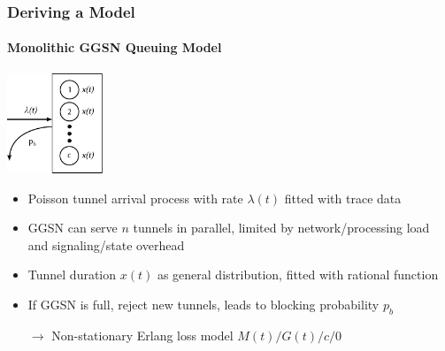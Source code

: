 \documentclass{beamer}
\begin{document}


\begin{frame}
	\frametitle{Deriving a Model}
	\framesubtitle{Monolithic GGSN Queuing Model}
		\begin{center}
			\includegraphics[height=3cm]{../../chapters/041-mobilenetsmeasuring/images/ggsn-monolithic.pdf}
		\end{center}

		\begin{itemize}
			\item Poisson tunnel arrival process with rate $\lambda(t)$ fitted with trace data
			\item GGSN can serve $n$ tunnels in parallel, limited by network/processing load and signaling/state overhead
			\item Tunnel duration $x(t)$ as general distribution, fitted with rational function
			\item If GGSN is full, reject new tunnels, leads to blocking probability $p_b$
			\item[$\rightarrow$] Non-stationary Erlang loss model $M(t)/G(t)/c/0$ 
		\end{itemize}

\end{frame}
\end{document}
